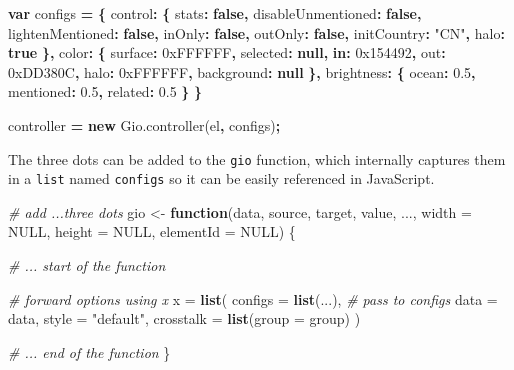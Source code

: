 \documentclass[10pt,]{krantz}
\makeatletter
\newenvironment{Shaded}{\begin{snugshade}}{\end{snugshade}}
\newcommand{\AttributeTok}[1]{\textcolor[rgb]{0.61,0.61,0.61}{#1}}
\newcommand{\BaseNTok}[1]{\textcolor[rgb]{0.06,0.06,0.06}{#1}}
\newcommand{\CommentTok}[1]{\textcolor[rgb]{0.37,0.37,0.37}{\textit{#1}}}
\newcommand{\ControlFlowTok}[1]{\textcolor[rgb]{0.27,0.27,0.27}{\textbf{#1}}}
\newcommand{\DataTypeTok}[1]{\textcolor[rgb]{0.27,0.27,0.27}{#1}}
\newcommand{\FloatTok}[1]{\textcolor[rgb]{0.06,0.06,0.06}{#1}}
\newcommand{\KeywordTok}[1]{\textcolor[rgb]{0.27,0.27,0.27}{\textbf{#1}}}
\newcommand{\NormalTok}[1]{#1}
\newcommand{\OperatorTok}[1]{\textcolor[rgb]{0.43,0.43,0.43}{\textbf{#1}}}
\newcommand{\OtherTok}[1]{\textcolor[rgb]{0.37,0.37,0.37}{#1}}
\newcommand{\StringTok}[1]{\textcolor[rgb]{0.5,0.5,0.5}{#1}}
\newcommand{\VariableTok}[1]{\textcolor[rgb]{0,0,0}{#1}}
\newenvironment{kframe}{%
\medskip{}
\setlength{\fboxsep}{.8em}
 \def\at@end@of@kframe{}%
 \ifinner\ifhmode%
  \def\at@end@of@kframe{\end{minipage}}%
  \begin{minipage}{\columnwidth}%
 \fi\fi%
 \def\FrameCommand##1{\hskip\@totalleftmargin \hskip-\fboxsep
 \colorbox{shadecolor}{##1}\hskip-\fboxsep
     \hskip-\linewidth \hskip-\@totalleftmargin \hskip\columnwidth}%
 \MakeFramed {\advance\hsize-\width
   \@totalleftmargin\z@ \linewidth\hsize
   \@setminipage}}%
 {\par\unskip\endMakeFramed%
 \at@end@of@kframe}
\renewenvironment{Shaded}{\begin{kframe}}{\end{kframe}}
\makeatother
\begin{document}
\begin{Shaded}
\begin{Highlighting}[]
\KeywordTok{var}\NormalTok{ configs }\OperatorTok{=} \OperatorTok{\{}
  \DataTypeTok{control}\OperatorTok{:} \OperatorTok{\{}
    \DataTypeTok{stats}\OperatorTok{:} \KeywordTok{false}\OperatorTok{,}
    \DataTypeTok{disableUnmentioned}\OperatorTok{:} \KeywordTok{false}\OperatorTok{,}
    \DataTypeTok{lightenMentioned}\OperatorTok{:} \KeywordTok{false}\OperatorTok{,}
    \DataTypeTok{inOnly}\OperatorTok{:} \KeywordTok{false}\OperatorTok{,}
    \DataTypeTok{outOnly}\OperatorTok{:} \KeywordTok{false}\OperatorTok{,}
    \DataTypeTok{initCountry}\OperatorTok{:} \StringTok{"CN"}\OperatorTok{,}
    \DataTypeTok{halo}\OperatorTok{:} \KeywordTok{true}
  \OperatorTok{\},}
  \DataTypeTok{color}\OperatorTok{:} \OperatorTok{\{}
    \DataTypeTok{surface}\OperatorTok{:} \BaseNTok{0xFFFFFF}\OperatorTok{,}
    \DataTypeTok{selected}\OperatorTok{:} \KeywordTok{null}\OperatorTok{,}
    \KeywordTok{in}\OperatorTok{:} \BaseNTok{0x154492}\OperatorTok{,}
    \DataTypeTok{out}\OperatorTok{:} \BaseNTok{0xDD380C}\OperatorTok{,}
    \DataTypeTok{halo}\OperatorTok{:} \BaseNTok{0xFFFFFF}\OperatorTok{,}
    \DataTypeTok{background}\OperatorTok{:} \KeywordTok{null}
  \OperatorTok{\},}
  \DataTypeTok{brightness}\OperatorTok{:} \OperatorTok{\{}
    \DataTypeTok{ocean}\OperatorTok{:} \FloatTok{0.5}\OperatorTok{,}
    \DataTypeTok{mentioned}\OperatorTok{:} \FloatTok{0.5}\OperatorTok{,}
    \DataTypeTok{related}\OperatorTok{:} \FloatTok{0.5}
  \OperatorTok{\}}
\OperatorTok{\}}

\NormalTok{controller }\OperatorTok{=} \KeywordTok{new} \VariableTok{Gio}\NormalTok{.}\AttributeTok{controller}\NormalTok{(el}\OperatorTok{,}\NormalTok{ configs)}\OperatorTok{;}
\end{Highlighting}
\end{Shaded}

The three dots can be added to the \texttt{gio} function, which internally captures them in a \texttt{list} named \texttt{configs} so it can be easily referenced in JavaScript.

\begin{Shaded}
\begin{Highlighting}[]
\CommentTok{# add ...three dots}
\NormalTok{gio <-}\StringTok{ }\ControlFlowTok{function}\NormalTok{(data, source, target, value, ..., }
  \DataTypeTok{width =} \OtherTok{NULL}\NormalTok{, }\DataTypeTok{height =} \OtherTok{NULL}\NormalTok{, }\DataTypeTok{elementId =} \OtherTok{NULL}\NormalTok{) \{}

  \CommentTok{# ... start of the function}

  \CommentTok{# forward options using x}
\NormalTok{  x =}\StringTok{ }\KeywordTok{list}\NormalTok{(}
    \DataTypeTok{configs =} \KeywordTok{list}\NormalTok{(...), }\CommentTok{# pass to configs}
    \DataTypeTok{data =}\NormalTok{ data,}
    \DataTypeTok{style =} \StringTok{"default"}\NormalTok{,}
    \DataTypeTok{crosstalk =} \KeywordTok{list}\NormalTok{(}\DataTypeTok{group =}\NormalTok{ group)}
\NormalTok{  )}

  \CommentTok{# ... end of the function}
\NormalTok{\}}
\end{Highlighting}
\end{Shaded}
\end{document}

